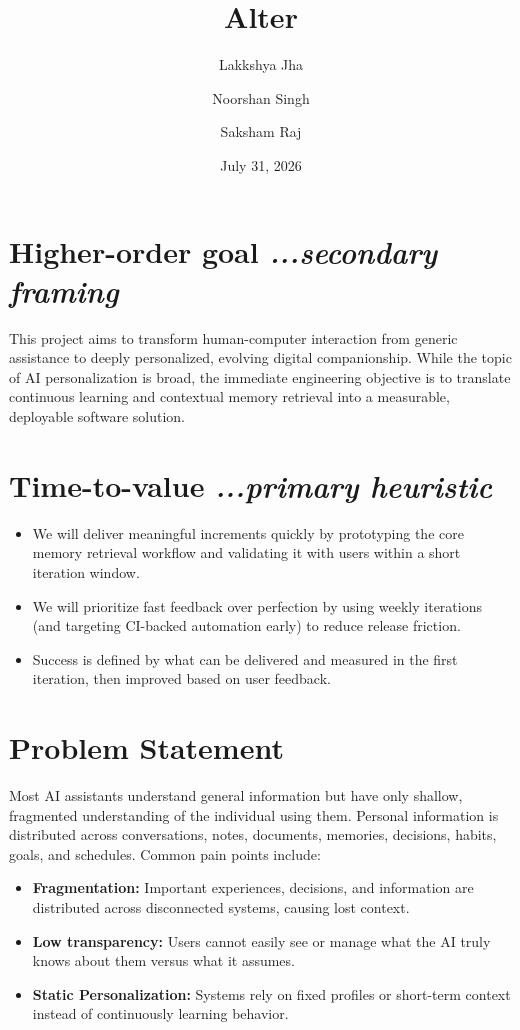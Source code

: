 \documentclass[11pt,a4paper]{article}
\title{Alter}
\author{
  Lakkshya Jha\footnotemark[1]
  \and 
  Noorshan Singh\footnotemark[2]
  \and
  Saksham Raj\footnotemark[3]
}
\date{July 31, 2026}
\begin{document}
\maketitle
{}

\section[Higher-order goal]{Higher-order goal \hfill \normalsize\normalfont\textit{...secondary framing}}
This project aims to transform human-computer interaction from generic assistance to deeply personalized, evolving digital companionship. While the topic of AI personalization is broad, the immediate engineering objective is to translate continuous learning and contextual memory retrieval into a measurable, deployable software solution.

\section[Time-to-value]{Time-to-value \hfill \normalsize\normalfont\textit{...primary heuristic}}
\begin{itemize}
    \item We will deliver meaningful increments quickly by prototyping the core memory retrieval workflow and validating it with users within a short iteration window.
    \item We will prioritize fast feedback over perfection by using weekly iterations (and targeting CI-backed automation early) to reduce release friction.
    \item Success is defined by what can be delivered and measured in the first iteration, then improved based on user feedback.
\end{itemize}

\section{Problem Statement}
Most AI assistants understand general information but have only shallow, fragmented understanding of the individual using them. Personal information is distributed across conversations, notes, documents, memories, decisions, habits, goals, and schedules. Common pain points include:
\begin{itemize}
    \item \textbf{Fragmentation:} Important experiences, decisions, and information are distributed across disconnected systems, causing lost context.
    \item \textbf{Low transparency:} Users cannot easily see or manage what the AI truly knows about them versus what it assumes.
    \item \textbf{Static Personalization:} Systems rely on fixed profiles or short-term context instead of continuously learning behavior.
\end{itemize}
\end{document}
